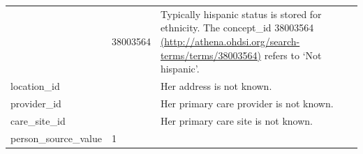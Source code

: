 \documentclass[]{book}
\begin{document}
\begin{longtable}[]{@{}lll@{}}
\begin{minipage}[t]{0.33\columnwidth}
\end{minipage} & \begin{minipage}[t]{0.16\columnwidth}\raggedright\strut
38003564\strut
\end{minipage} & \begin{minipage}[t]{0.42\columnwidth}\raggedright\strut
Typically hispanic status is stored for ethnicity. The concept\_id
38003564
\href{http://athena.ohdsi.org/search-terms/terms/38003564}{(http://athena.ohdsi.org/search-terms/terms/38003564)}
refers to `Not hispanic'.\strut
\end{minipage}\tabularnewline
\begin{minipage}[t]{0.33\columnwidth}\raggedright\strut
location\_id\strut
\end{minipage} & \begin{minipage}[t]{0.16\columnwidth}\raggedright\strut
\strut
\end{minipage} & \begin{minipage}[t]{0.42\columnwidth}\raggedright\strut
Her address is not known.\strut
\end{minipage}\tabularnewline
\begin{minipage}[t]{0.33\columnwidth}\raggedright\strut
provider\_id\strut
\end{minipage} & \begin{minipage}[t]{0.16\columnwidth}\raggedright\strut
\strut
\end{minipage} & \begin{minipage}[t]{0.42\columnwidth}\raggedright\strut
Her primary care provider is not known.\strut
\end{minipage}\tabularnewline
\begin{minipage}[t]{0.33\columnwidth}\raggedright\strut
care\_site\_id\strut
\end{minipage} & \begin{minipage}[t]{0.16\columnwidth}\raggedright\strut
\strut
\end{minipage} & \begin{minipage}[t]{0.42\columnwidth}\raggedright\strut
Her primary care site is not known.\strut
\end{minipage}\tabularnewline
\begin{minipage}[t]{0.33\columnwidth}\raggedright\strut
person\_source\_value\strut
\end{minipage} & \begin{minipage}[t]{0.16\columnwidth}\raggedright\strut
1\strut
\end{minipage} & \begin{minipage}[t]{0.42\columnwidth}\raggedright\strut

\end{minipage}
\end{longtable}
\end{document}
